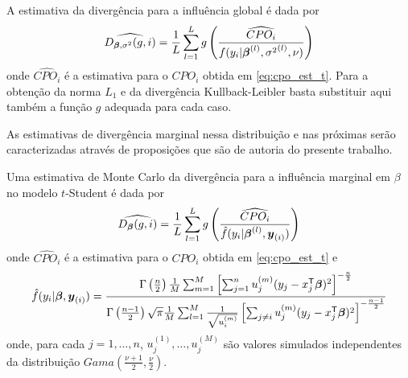 A estimativa da divergência para a influência global é dada por
\begin{equation}
\widehat{D_{{\boldsymbol{\beta}},\sigma^2}(g,i)} = \frac{1}{L}\sum_{l=1}^L g\left(\frac{\widehat{CPO_i}}{f(y_i|{\boldsymbol{\beta}}^{(l)},{\sigma^2}^{(l)},\nu)}\right)
\end{equation}
onde $\widehat{CPO_i}$ é a estimativa para o $CPO_i$ obtida em \eqref{eq:cpo_est_t}. Para a obtenção da norma $L_1$ e da divergência Kullback-Leibler basta substituir aqui também a função $g$ adequada para cada caso.

As estimativas de divergência marginal nessa distribuição e nas próximas serão caracterizadas através de proposições que são de autoria do presente trabalho.

\begin{prop}
Uma estimativa de Monte Carlo da divergência para a influência marginal em $\beta$ no modelo $t$-Student é dada por
\begin{equation}
\widehat{D_{\boldsymbol{\beta}}(g,i)} = \frac{1}{L}\sum_{l=1}^L g\left(\frac{\widehat{CPO_i}}{\hat{f}(y_i|{\boldsymbol{\beta}}^{(l)},{\boldsymbol{y}_{(i)}})}\right)
\end{equation}
onde $\widehat{CPO_i}$ é a estimativa para o $CPO_i$ obtida em \eqref{eq:cpo_est_t} e 
\begin{equation}
\hat{f}(y_i|{\boldsymbol{\beta}},{\boldsymbol{y}_{(i)}}) = \frac{
\Gamma\left(\frac{n}{2}\right)\frac{1}{M}\sum_{m=1}^M\left[\sum_{j=1}^n u_j^{(m)}(y_j-x_j^{\mathsf{T}}{\boldsymbol{\beta}})^2\right]^{-\frac{n}{2}} }{
\Gamma\left(\frac{n-1}{2}\right)\sqrt{\pi}\frac{1}{M}\sum_{l=1}^M \frac{1}{\sqrt{u_i^{(m)}}}  \left[\sum_{j\neq i}u_j^{(m)}(y_j-x_j^{\mathsf{T}}{\boldsymbol{\beta}})^2\right]^{-\frac{n-1}{2}}
}
\end{equation}
onde, para cada $j=1,\ldots,n$, $u_j^{(1)},\ldots,u_j^{(M)}$ são valores simulados independentes da distribuição $Gama(\frac{\nu+1}{2},\frac{\nu}{2})$.
\end{prop}

